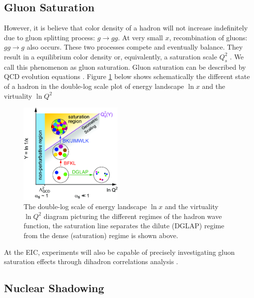 \subsection{Gluon Saturation}

However, it is believe that color density of a hadron will not increase indefinitely due to gluon splitting process: $g \rightarrow gg$. At very small $x$, recombination of gluons: $gg \rightarrow g$ also occurs. These two processes compete and eventually balance. They result in a equilibrium color density or, equivalently, a saturation scale $Q_s^2$ \cite{GSIntro}. We call this phenomenon as gluon saturation. Gluon saturation can be described by QCD evolution equations \cite{DGLAP1,DGLAP2,DGLAP3,BFKL,JIMWLKBK}. Figure \ref{GSScalePlot} below shows schematically the different state of a hadron in the double-log scale plot of energy landscape $\ln x$ and the virtuality $\ln Q^2$ \cite{GluonSatuPlot}

\begin{figure}[hbtp]
\begin{center}
\includegraphics[width=0.45\textwidth]{Figures/Chapter1/GSScalePlot.png}
\caption{The double-log scale of energy landscape $\ln x$ and the virtuality $\ln Q^2$ diagram picturing the different regimes of the hadron wave function, the saturation line separates the dilute (DGLAP) regime from the dense (saturation) regime is shown above.}
\label{GSScalePlot}
\end{center}
\end{figure} 

At the EIC, experiments will also be capable of precisely investigating gluon saturation effects through dihadron correlations analysis \cite{}.


\subsection{Nuclear Shadowing}

